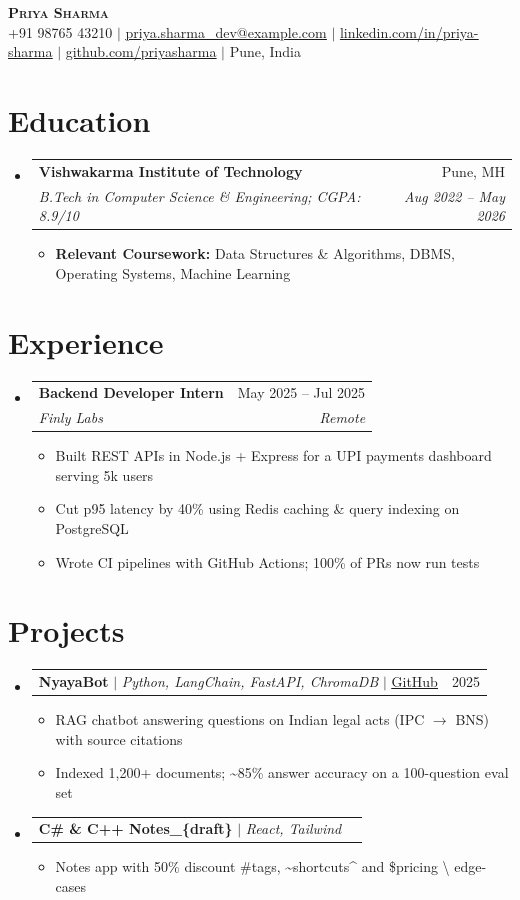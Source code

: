 \documentclass[letterpaper,11pt]{article}
\makeatletter
\newcommand{\resumeItem}[1]{
  \item\small{
    {#1 \vspace{-2pt}}
  }
}
\newcommand{\resumeSubheading}[4]{
  \vspace{-2pt}\item
    \begin{tabular*}{0.97\textwidth}[t]{l@{\extracolsep{\fill}}r}
      \textbf{#1} & #2 \\
      \textit{\small#3} & \textit{\small #4} \\
    \end{tabular*}\vspace{-7pt}
}
\newcommand{\resumeProjectHeading}[2]{
    \item
    \begin{tabular*}{0.97\textwidth}{l@{\extracolsep{\fill}}r}
      \small#1 & #2 \\
    \end{tabular*}\vspace{-7pt}
}
\newcommand{\resumeSubHeadingListStart}{\begin{itemize}[leftmargin=0.15in, label={}]}
\newcommand{\resumeSubHeadingListEnd}{\end{itemize}}
\newcommand{\resumeItemListStart}{\begin{itemize}}
\newcommand{\resumeItemListEnd}{\end{itemize}\vspace{-5pt}}
\makeatother
\begin{document}
\begin{center}
    \textbf{\Huge \scshape Priya Sharma} \\ \vspace{1pt}
    \small +91 98765 43210 $|$ \href{mailto:priya.sharma_dev@example.com}{\underline{priya.sharma\_dev@example.com}} $|$ \href{https://www.linkedin.com/in/priya-sharma/}{\underline{linkedin.com/in/priya-sharma}} $|$ \href{https://github.com/priyasharma}{\underline{github.com/priyasharma}} $|$ Pune, India
\end{center}
\section{Education}
  \resumeSubHeadingListStart
    \resumeSubheading
      {Vishwakarma Institute of Technology}{Pune, MH}
      {B.Tech in Computer Science \& Engineering; CGPA: 8.9/10}{Aug 2022 -- May 2026}
      \resumeItemListStart
        \resumeItem{\textbf{Relevant Coursework:} Data Structures \& Algorithms, DBMS, Operating Systems, Machine Learning}
      \resumeItemListEnd
  \resumeSubHeadingListEnd

\section{Experience}
  \resumeSubHeadingListStart
    \resumeSubheading
      {Backend Developer Intern}{May 2025 -- Jul 2025}
      {Finly Labs}{Remote}
      \resumeItemListStart
        \resumeItem{Built REST APIs in Node.js + Express for a UPI payments dashboard serving 5k users}
        \resumeItem{Cut p95 latency by 40\% using Redis caching \& query indexing on PostgreSQL}
        \resumeItem{Wrote CI pipelines with GitHub Actions; 100\% of PRs now run tests}
      \resumeItemListEnd
  \resumeSubHeadingListEnd

\section{Projects}
  \resumeSubHeadingListStart
    \resumeProjectHeading
      {\textbf{NyayaBot} $|$ \emph{Python, LangChain, FastAPI, ChromaDB} $|$ \href{https://github.com/priyasharma/nyayabot}{\underline{GitHub}}}{2025}
      \resumeItemListStart
        \resumeItem{RAG chatbot answering questions on Indian legal acts (IPC $\rightarrow$ BNS) with source citations}
        \resumeItem{Indexed 1,200+ documents; \textasciitilde{}85\% answer accuracy on a 100-question eval set}
      \resumeItemListEnd
    \resumeProjectHeading
      {\textbf{C\# \& C++ Notes\_\{draft\}} $|$ \emph{React, Tailwind}}{}
      \resumeItemListStart
        \resumeItem{Notes app with 50\% discount \#tags, \textasciitilde{}shortcuts\textasciicircum{} and \$pricing \textbackslash{} edge-cases}
      \resumeItemListEnd
  \resumeSubHeadingListEnd
\end{document}
